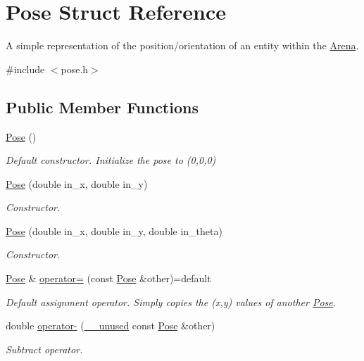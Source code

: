 \hypertarget{structPose}{}\section{Pose Struct Reference}
\label{structPose}


A simple representation of the position/orientation of an entity within the \hyperlink{classArena}{Arena}.  




{\ttfamily \#include $<$pose.\+h$>$}

\subsection*{Public Member Functions}
\begin{DoxyCompactItemize}
\item 
\hyperlink{structPose_a8a4171c8a6b09e37fb011997da9ea2ad}{Pose} ()\hypertarget{structPose_a8a4171c8a6b09e37fb011997da9ea2ad}{}\label{structPose_a8a4171c8a6b09e37fb011997da9ea2ad}

\begin{DoxyCompactList}\small\item\em Default constructor. Initialize the pose to (0,0,0) \end{DoxyCompactList}\item 
\hyperlink{structPose_ac947d7046547d883f782ab2408cb80ed}{Pose} (double in\+\_\+x, double in\+\_\+y)
\begin{DoxyCompactList}\small\item\em Constructor. \end{DoxyCompactList}\item 
\hyperlink{structPose_a6ebb8a1510c5915fa1dbec0f7ba0ad1c}{Pose} (double in\+\_\+x, double in\+\_\+y, double in\+\_\+theta)
\begin{DoxyCompactList}\small\item\em Constructor. \end{DoxyCompactList}\item 
\hyperlink{structPose}{Pose} \& \hyperlink{structPose_aec0a9478daefa358aa2f1873cbaf0271}{operator=} (const \hyperlink{structPose}{Pose} \&other)=default
\begin{DoxyCompactList}\small\item\em Default assignment operator. Simply copies the (x,y) values of another \hyperlink{structPose}{Pose}. \end{DoxyCompactList}\item 
double \hyperlink{structPose_a8cecc533fda99d9b3dd2dfb7be782890}{operator-\/} (\hyperlink{common_8h_a2e3484535ee610c8e19e9859563abe48}{\+\_\+\+\_\+unused} const \hyperlink{structPose}{Pose} \&other)
\begin{DoxyCompactList}\small\item\em Subtract operator. \end{DoxyCompactList}\end{DoxyCompactItemize}

